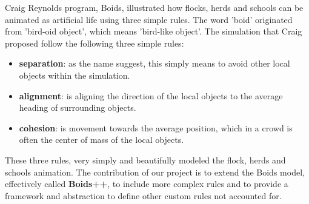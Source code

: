 Craig Reynolds program, Boids\cite{Reynolds:1987}, illustrated how flocks, herds and schools can be animated as artificial life using three simple rules. The word 'boid' originated from 'bird-oid object', which means 'bird-like object'. The simulation that Craig proposed follow the following three simple rules:
\begin{itemize}
    \item \textbf{separation}: as the name suggest, this simply means to avoid other local objects within the simulation.
    \item \textbf{alignment}: is aligning the direction of the local objects to the average heading of surrounding objects.
    \item \textbf{cohesion}: is movement towards the average position, which in a crowd is often the center of mass of the local objects.
\end{itemize}

These three rules, very simply and beautifully modeled the flock, herds and schools animation. The contribution of our project is to extend the Boids model, effectively called \textbf{Boids++}, to include more complex rules and to provide a framework and abstraction to define other custom rules not accounted for.